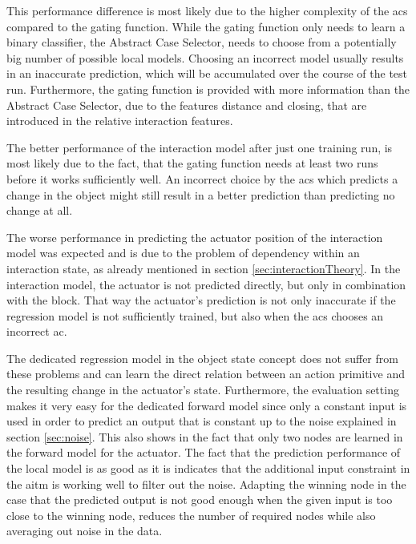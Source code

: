 This performance difference is most likely due to the higher complexity of the \acrfull{acs} compared to the gating function. While the gating function only needs to learn a binary classifier, the Abstract Case Selector, needs to choose from a potentially big number of possible local models. Choosing an incorrect model usually results in an inaccurate prediction, which will be accumulated over the course of the test run. Furthermore, the gating function is provided with more information than the Abstract Case Selector, due to the features distance and closing, that are introduced in the relative interaction features. 

The better performance of the interaction model after just one training run, is most likely due to the fact, that the gating function needs at least two runs before it works sufficiently well. An incorrect choice by the \gls{acs} which predicts a change in the object might still result in a better prediction than predicting no change at all. 

The worse performance in predicting the actuator position of the interaction model was expected and is due to the problem of dependency within an interaction state, as already mentioned in section \ref{sec:interactionTheory}. In the interaction model, the actuator is not predicted directly, but only in combination with the block. That way the actuator's prediction is not only inaccurate if the regression model is not sufficiently trained, but also when the \gls{acs} chooses an incorrect \gls{ac}. 

The dedicated regression model in the object state concept does not suffer from these problems and can learn the direct relation between an action primitive and the resulting change in the actuator's state. Furthermore, the evaluation setting makes it very easy for the dedicated forward model since only a constant input is used in order to predict an output that is constant up to the noise explained in section \ref{sec:noise}. This also shows in the fact that only two nodes are learned in the forward model for the actuator. The fact that the prediction performance of the local model is as good as it is indicates that the additional input constraint in the \gls{aitm} is working well to filter out the noise. Adapting the winning node in the case that the predicted output is not good enough when the given input is too close to the winning node, reduces the number of required nodes while also averaging out noise in the data.

